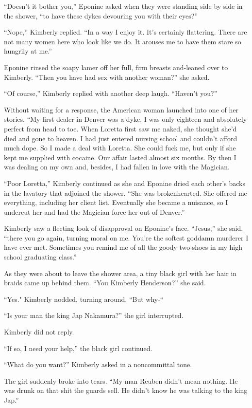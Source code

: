 \documentclass[]{article}
\begin{document}
{“Doesn’t it bother you,” Eponine asked when they were standing side by side in the shower, “to have these dykes devouring you with their eyes?”

“Nope,” Kimberly replied.  “In a way I enjoy it.  It’s certainly flattering.  There are not many women here who look like we do.  It arouses me to have them stare so hungrily at me.”

Eponine rinsed the soapy lamer off her full, firm breasts and-leaned over to Kimberly.  “Then you have had sex with another woman?” she asked.

“Of course,” Kimberly replied with another deep laugh.  “Haven’t you?”

Without waiting for a response, the American woman launched into one of her stories.  “My first dealer in Denver was a dyke.  I was only eighteen and absolutely perfect from head to toe.  When Loretta first saw me naked, she thought she’d died and gone to heaven.  I had just entered nursing school and couldn’t afford much dope.  So I made a deal with Loretta.  She could fuck me, but only if she kept me supplied with cocaine.  Our affair lasted almost six months.  By then I was dealing on my own and, besides, I had fallen in love with the Magician.

“Poor Loretta,” Kimberly continued as she and Eponine dried each other’s backs in the lavatory that adjoined the shower.  “She was brokenhearted.  She offered me everything, including her client list.  Eventually she became a nuisance, so I undercut her and had the Magician force her out of Denver.”

Kimberly saw a fleeting look of disapproval on Eponine’s face.  “Jesus,” she said, “there you go again, turning moral on me.  You’re the softest goddamn murderer I have ever met.  Sometimes you remind me of all the goody two-shoes in my high school graduating class.”

As they were about to leave the shower area, a tiny black girl with her hair in braids came up behind them.  “You Kimberly Henderson?” she said.

“Yes."  Kimberly nodded, turning around.  “But why-“

“Is your man the king Jap Nakamura?” the girl interrupted.

Kimberly did not reply.

“If so, I need your help,” the black girl continued.

“What do you want?” Kimberly asked in a noncommittal tone.

The girl suddenly broke into tears.  “My man Reuben didn’t mean nothing.  He was drunk on that shit the guards sell.  He didn’t know he was talking to the king Jap.”

}
\end{document}

